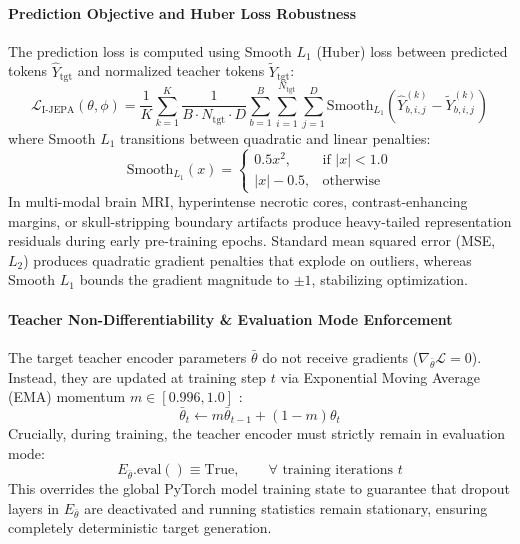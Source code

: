 \documentclass{article}
\begin{document}
\paragraph{Prediction Objective and Huber Loss Robustness}
The prediction loss is computed using Smooth $L_1$ (Huber) loss between predicted tokens $\hat{Y}_{\text{tgt}}$ and normalized teacher tokens $\tilde{Y}_{\text{tgt}}$:
\begin{equation}
    \mathcal{L}_{\text{I-JEPA}}(\theta, \phi) = \frac{1}{K} \sum_{k=1}^K \frac{1}{B \cdot N_{\text{tgt}} \cdot D} \sum_{b=1}^B \sum_{i=1}^{N_{\text{tgt}}} \sum_{j=1}^D \text{Smooth}_{L_1}\left(\hat{Y}_{b, i, j}^{(k)} - \tilde{Y}_{b, i, j}^{(k)}\right)
\end{equation}
where Smooth $L_1$ transitions between quadratic and linear penalties:
\begin{equation}
    \text{Smooth}_{L_1}(x) = \begin{cases} 0.5 x^2, & \text{if } |x| < 1.0 \\ |x| - 0.5, & \text{otherwise} \end{cases}
\end{equation}
In multi-modal brain MRI, hyperintense necrotic cores, contrast-enhancing margins, or skull-stripping boundary artifacts produce heavy-tailed representation residuals during early pre-training epochs. Standard mean squared error (MSE, $L_2$) produces quadratic gradient penalties that explode on outliers, whereas Smooth $L_1$ bounds the gradient magnitude to $\pm 1$, stabilizing optimization.

\paragraph{Teacher Non-Differentiability \& Evaluation Mode Enforcement}
The target teacher encoder parameters $\bar{\theta}$ do not receive gradients ($\nabla_{\bar{\theta}} \mathcal{L} = 0$). Instead, they are updated at training step $t$ via Exponential Moving Average (EMA) momentum $m \in [0.996, 1.0]$ \citep{grill2020bootstrap,assran2023ijepa}:
\begin{equation}
    \bar{\theta}_t \leftarrow m \bar{\theta}_{t-1} + (1 - m) \theta_t
\end{equation}
Crucially, during training, the teacher encoder must strictly remain in evaluation mode:
\begin{equation}
    E_{\bar{\theta}}.\text{eval}() \equiv \text{True}, \qquad \forall \text{ training iterations } t
\end{equation}
This overrides the global PyTorch model training state to guarantee that dropout layers in $E_{\bar{\theta}}$ are deactivated and running statistics remain stationary, ensuring completely deterministic target generation.
\end{document}
